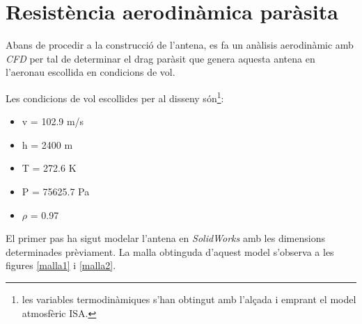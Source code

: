 \section{Resistència aerodinàmica paràsita}
Abans de procedir a la construcció de l'antena, es fa un anàlisis aerodinàmic amb \textit{CFD} per tal de determinar el drag paràsit que genera aquesta antena en l'aeronau escollida en condicions de vol.

Les condicions de vol escollides per al disseny són\footnote{les variables termodinàmiques s'han obtingut amb l'alçada i emprant el model atmosfèric ISA.}:
\begin{itemize}
\item v = 102.9 m/s
\item h = 2400 m
\item T = 272.6 K
\item P = 75625.7 Pa
\item $\rho$ = 0.97
\end{itemize}

El primer pas ha sigut modelar l'antena en \textit{SolidWorks} amb les dimensions determinades prèviament. La malla obtinguda d'aquest model s'observa a les figures \ref{malla1} i \ref{malla2}.

